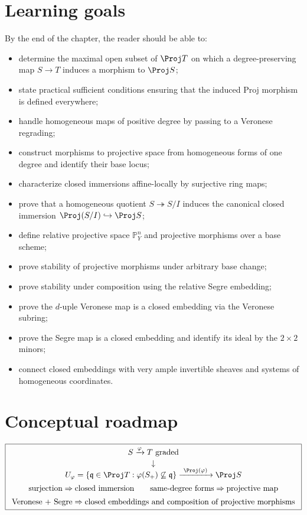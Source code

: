 \section*{Learning goals}
By the end of the chapter, the reader should be able to:
\begin{itemize}
\item determine the maximal open subset of \(\Proj T\) on which a degree-preserving map \(S\to T\) induces a morphism to \(\Proj S\);
\item state practical sufficient conditions ensuring that the induced Proj morphism is defined everywhere;
\item handle homogeneous maps of positive degree by passing to a Veronese regrading;
\item construct morphisms to projective space from homogeneous forms of one degree and identify their base locus;
\item characterize closed immersions affine-locally by surjective ring maps;
\item prove that a homogeneous quotient \(S\twoheadrightarrow S/I\) induces the canonical closed immersion \(\Proj(S/I)\hookrightarrow\Proj S\);
\item define relative projective space \(\mathbb P^n_Y\) and projective morphisms over a base scheme;
\item prove stability of projective morphisms under arbitrary base change;
\item prove stability under composition using the relative Segre embedding;
\item prove the \(d\)-uple Veronese map is a closed embedding via the Veronese subring;
\item prove the Segre map is a closed embedding and identify its ideal by the \(2\times2\) minors;
\item connect closed embeddings with very ample invertible sheaves and systems of homogeneous coordinates.
\end{itemize}

\section*{Conceptual roadmap}
\[
\boxed{
\begin{array}{c}
S\xrightarrow{\varphi}T\ \text{graded}\\[2pt]
\downarrow\\[-2pt]
U_\varphi=\{\mathfrak q\in\Proj T:\varphi(S_+)\not\subseteq\mathfrak q\}
\xrightarrow{\ \Proj(\varphi)\ }\Proj S\\[5pt]
\text{surjection}\Rightarrow\text{closed immersion}\qquad
\text{same-degree forms}\Rightarrow\text{projective map}\\[5pt]
\text{Veronese + Segre}\Rightarrow\text{closed embeddings and composition of projective morphisms}
\end{array}}
\]

